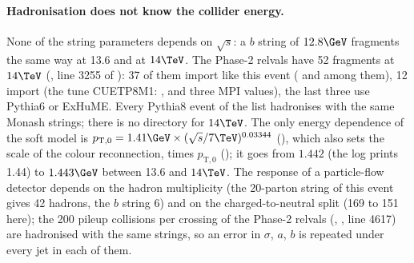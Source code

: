 \paragraph{Hadronisation does not know the collider energy.}
None of the string parameters depends on $\sqrt s$: a $b$ string of $12.8\GeV$ fragments the same way at 13.6 and at
$14\TeV$. The Phase-2 relvals have 52 fragments at $14\TeV$ (, line 3255 of
): 37 of them import
 like this event ( and
 among them), 12 import  (the tune
CUETP8M1: ,  and three MPI values), the last three use Pythia6 or ExHuME. Every
Pythia8 event of the list hadronises with the same Monash strings; there is no  directory for $14\TeV$.
The only energy dependence of the soft model is $p_{\mathrm{T},0} = 1.41\GeV\times(\sqrt s/7\TeV)^{0.03344}$
(), which also sets the scale of the colour reconnection,  times
$p_{\mathrm{T},0}$ (); it goes from $1.442$ (the log prints 1.44) to $1.443\GeV$ between
13.6 and $14\TeV$. The response of a particle-flow detector depends on the hadron multiplicity (the 20-parton string
of this event gives 42 hadrons, the $b$ string 6) and on the charged-to-neutral split (169 to 151 here); the 200
pileup collisions per crossing of the Phase-2 relvals (, , line 4617)
are hadronised with the same strings, so an error in $\sigma$, $a$, $b$ is repeated under every jet in each of them.

